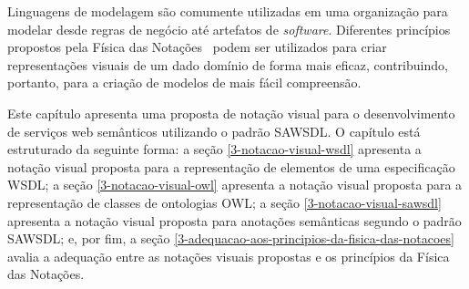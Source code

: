 Linguagens de modelagem são comumente utilizadas em uma organização para modelar desde regras de negócio até artefatos de \textit{software}. Diferentes princípios propostos pela Física das Notações~\cite{MOODY-2009-Physics-Notation} podem ser utilizados para criar representações visuais de um dado domínio de forma mais eficaz, contribuindo, portanto, para a criação de modelos de mais fácil compreensão.

Este capítulo apresenta uma proposta de notação visual para o desenvolvimento de serviços web semânticos utilizando o padrão SAWSDL. O capítulo está estruturado da seguinte forma: a seção \ref{3-notacao-visual-wsdl} apresenta a notação visual proposta para a representação de elementos de uma especificação WSDL; a seção \ref{3-notacao-visual-owl} apresenta a notação visual proposta para a representação de classes de ontologias OWL; a seção \ref{3-notacao-visual-sawsdl} apresenta a notação visual proposta para anotações semânticas segundo o padrão SAWSDL; e, por fim, a seção \ref{3-adequacao-aos-principios-da-fisica-das-notacoes} avalia a adequação entre as notações visuais propostas e os princípios da Física das Notações.


